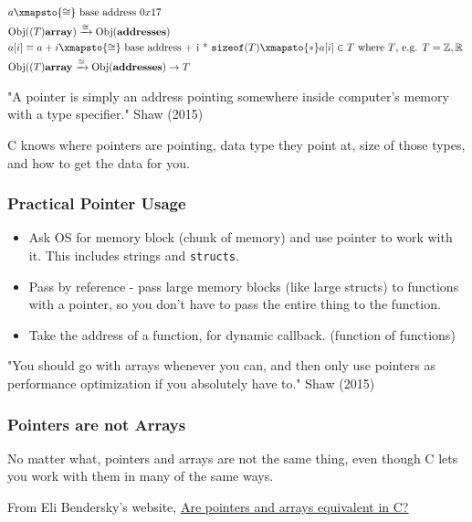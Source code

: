 \documentclass[10pt]{amsart}
\begin{document}
\begin{multicols*}{2}
\[
\begin{gathered}
\begin{aligned}
&	a \xmapsto{ \cong } \text{ base address $0x17$ } \\
&	\text{Obj}{((T)\textbf{array})} \xrightarrow{ \cong } \text{Obj}{(\textbf{addresses})}  \\	
&	a[i] \equiv a+i \xmapsto{ \cong } \text{ base address + i * } \verb|sizeof|(T)  \xmapsto{ * } a[i] \in T \text{ where $T$, e.g. $T = \mathbb{Z},\mathbb{R}$ } \\ 
& \text{Obj}{((T)\textbf{array}} \xrightarrow{ \cong } \text{Obj}{(\textbf{addresses})} \to T  
\end{aligned}
\end{gathered}
\]

"A pointer is simply an address pointing somewhere inside computer's memory with a type specifier."  Shaw (2015) \cite{Shaw2015}


C knows where pointers are pointing, data type they point at, size of those types, and how to get the data for you.  

\subsubsection{Practical Pointer Usage}
\begin{itemize}
	\item Ask OS for memory block (chunk of memory) and use pointer to work with it.  This includes strings and \verb|structs|.  
	\item Pass by reference - pass large memory blocks (like large structs) to functions with a pointer, so you don't have to pass the entire thing to the function.  
	\item Take the address of a function, for dynamic callback. (function of functions)
\end{itemize}

"You should go with arrays whenever you can, and then only use pointers as performance optimization if you absolutely have to."  Shaw (2015) \cite{Shaw2015}

\subsubsection{Pointers are not Arrays}  

No matter what, pointers and arrays are not the same thing, even though C lets you work with them in many of the same ways.  

From Eli Bendersky's website, \href{https://eli.thegreenplace.net/2009/10/21/are-pointers-and-arrays-equivalent-in-c}{Are pointers and arrays equivalent in C?}


\end{multicols*}
\end{document}

